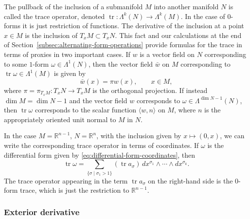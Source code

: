 \par\endgroup
{The pullback of the inclusion of a submanifold $M$ into another manifold $N$ is called the trace operator, denoted $\operatorname{tr}:\Lambda^k(N)\to\Lambda^k(M)$. In the case of $0$-forms it is just restriction of functions. The derivative of the inclusion at a point $x\in M$ is the inclusion of $T_xM\subset T_xN$. This fact and our calculations at the end of Section~\ref{subsec:alternating-form-operations} provide formulas for the trace in terms of proxies in two important cases. If $w$ is a vector field on $N$ corresponding to some $1$-form $\omega\in\Lambda^1(N)$, then the vector field $\bar w$ on $M$ corresponding to $\operatorname{tr}\omega\in\Lambda^1(M)$ is given by}
\[
\bar w(x)=\pi w(x),\qquad x\in M,
\]
{where $\pi=\pi_{T_xM}:T_xN\to T_xM$ is the orthogonal projection. If instead $\dim M=\dim N-1$ and the vector field $w$ corresponds to $\omega\in\Lambda^{\dim N-1}(N)$, then $\operatorname{tr}\omega$ corresponds to the scalar function $\langle w,n\rangle$ on $M$, where $n$ is the appropriately oriented unit normal to $M$ in $N$.}

{In the case $M=\mathbb R^{n-1}$, $N=\mathbb R^n$, with the inclusion given by $x\mapsto(0,x)$, we can write the corresponding trace operator in terms of coordinates. If $\omega$ is the differential form given by \eqref{eq:differential-form-coordinates}, then}
\begin{equation}\label{eq:differential-trace-coordinates}
\operatorname{tr}\omega=\sum_{\{\sigma\mid\sigma_1>1\}}(\operatorname{tr}a_\sigma)\,dx^{\sigma_1}\wedge\cdots\wedge dx^{\sigma_k}.
\end{equation}
{The trace operator appearing in the term $\operatorname{tr}a_\sigma$ on the right-hand side is the $0$-form trace, which is just the restriction to $\mathbb R^{n-1}$.}

\subsubsection{{Exterior derivative}}\label{subsec:exterior-derivative}


